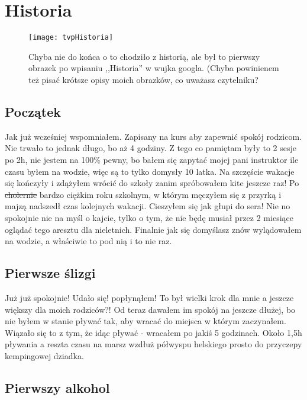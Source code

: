 \documentclass{article}
\begin{document}
	\section{Historia}
	
	\begin{figure}[h]
			\centering
			\texttt{[image: tvpHistoria]}
			\caption{Chyba nie do końca o to chodziło z historią, ale był to pierwszy 					obrazek po wpisaniu ,,Historia'' w wujka googla. (Chyba powinienem też pisać 				krótsze opisy moich obrazków, co uważasz czytelniku?}
		\end{figure}
	
	\subsection{Początek}
		Jak już wcześniej wspomniałem. Zapisany na kurs aby zapewnić spokój rodzicom. Nie 			trwało to jednak długo, bo aż 4 godziny. Z tego co pamiętam były to 2 sesje po 2h, 		nie jestem na 100\% pewny, bo bałem się zapytać mojej pani instruktor ile czasu 			byłem na wodzie, więc są to tylko domysły 10 latka. Na szczęście wakacje się 				kończyły i zdążyłem wrócić do szkoły zanim spróbowałem kite jeszcze raz! Po 				\sout{cholernie} bardzo ciężkim roku szkolnym, w którym męczyłem się z przyrką i 			majzą nadszedł czas kolejnych wakacji. Cieszyłem się jak głupi do sera! Nie no 				spokojnie nie na myśl o kajcie, tylko o tym, że nie będę musiał przez 2 miesiące 			oglądać tego aresztu dla nieletnich. Finalnie jak się domyślasz znów wylądowałem 			na wodzie, a właściwie to pod nią i to nie raz.
	
	\subsection{Pierwsze ślizgi}
	
		Już już spokojnie! Udało się! popłynąłem! To był wielki krok dla mnie a jeszcze 			większy dla moich rodziców?! Od teraz dawałem im spokój na jeszcze dłużej, bo nie 			byłem w stanie pływać tak, aby wracać do miejsca w którym zaczynałem. Wiązało się 			to z tym, że idąc pływać - wracałem po jakiś 5 godzinach. Około 1,5h pływania a 			reszta czasu na marsz wzdłuż półwyspu helskiego prosto do przyczepy kempingowej 			dziadka.  
	
	\subsection{Pierwszy alkohol}	
	
\end{document}
